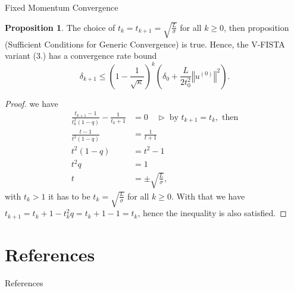 \documentclass[11pt]{beamer}
\theoremstyle{definition}
\newtheorem{prop}{Proposition}[section]
\begin{document}
    \begin{frame}{Fixed Momentum Convergence}
        \begin{prop}
            The choice of $t_k = t_{k + 1} = \sqrt{\frac{L}{\sigma}}$ for all $k \ge 0$, then proposition (Sufficient Conditions for Generic Convergence) is true. 
            Hence, the V-FISTA variant (3.) has a convergence rate bound 
            \[
                \delta_{k + 1}
                \le 
                \left(
                    1 - \frac{1}{\sqrt{\kappa}}
                \right)^k\left(
                    \delta_0 + \frac{L}{2t_0^2}\left\Vert
                        u^{(0)}
                    \right\Vert^2
                \right).        
            \]
        \end{prop}
    \end{frame}
    \begin{frame}
        \begin{proof}
            we have 
            \begin{align*}
                \frac{t_{k + 1} - 1}{t^2_k(1 - q)}
                    -
                \frac{1}{t_k + 1} &= 0
                \quad 
                \triangleright\; \text{by } t_{k + 1} = t_k, \text{ then}
                \\
                \frac{t - 1}{t^2(1 - q)} &= \frac{1}{t + 1}
                \\
                t^2(1 - q) 
                &= t^2 - 1
                \\
                t^2q &= 1
                \\
                t &= \pm \sqrt{\frac{L}{\sigma}}, 
            \end{align*}
            with $t_k > 1$ it has to be $t_k = \sqrt{\frac{L}{\sigma}}$ for all $k \ge 0$. 
            With that we have $t_{k + 1} = t_{k} + 1 - t_k^2 q = t_k + 1 - 1 = t_k$, hence the inequality is also satisfied. 
        \end{proof}        
    \end{frame}


    
\section{References}
    \begin{frame}[allowframebreaks]{References}
        
        
    \end{frame}
\end{document}
